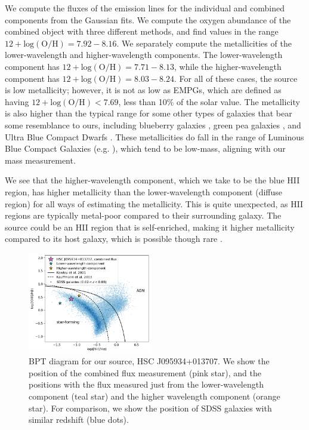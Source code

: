 We compute the fluxes of the emission lines for the individual and combined components from the Gaussian fits.
We compute the oxygen abundance of the combined object with three different methods, and find values in the range $12+\mathrm{log(O/H)} = 7.92-8.16$.
We separately compute the metallicities of the lower-wavelength and higher-wavelength components. 
The lower-wavelength component has $12+\mathrm{log(O/H)} = 7.71-8.13$, while the higher-wavelength component has $12+\mathrm{log(O/H)} = 8.03-8.24$.
For all of these cases, the source is low metallicity; however, it is not as low as EMPGs, which are defined as having $12+\mathrm{log(O/H)} < 7.69$, less than 10\% of the solar value.
The metallicity is also higher than the typical range for some other types of galaxies that bear some resemblance to ours, including blueberry galaxies \citep{Yang2017}, green pea galaxies \citep{Cardamone2009}, and Ultra Blue Compact Dwarfs \citep{Corbin2006}.
These metallicities do fall in the range of Luminous Blue Compact Galaxies (e.g. \citealt{Hoyos2007}), which tend to be low-mass, aligning with our mass measurement.

We see that the higher-wavelength component, which we take to be the blue HII region, has higher metallicity than the lower-wavelength component (diffuse region) for all ways of estimating the metallicity.
This is quite unexpected, as HII regions are typically metal-poor compared to their surrounding galaxy.
The source could be an HII region that is self-enriched, making it higher metallicity compared to its host galaxy, which is possible though rare \citep{Kroger2006}. 

\begin{figure}
    \centering
    \includegraphics[width=0.48\textwidth]{bpt}
    \caption{BPT diagram for our source, HSC J095934+013707. We show the position of the combined flux measurement (pink star), and the positions with the flux measured just from the lower-wavelength component (teal star) and the higher wavelength component (orange star). For comparison, we show the position of SDSS galaxies with similar redshift (blue dots).}
    \label{fig:bpt}
\end{figure}

